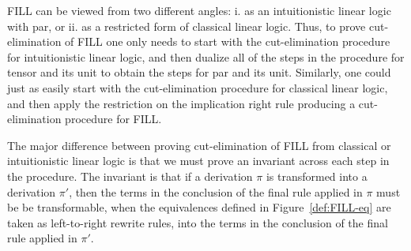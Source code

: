 \documentclass{elsarticle}
\begin{document}
FILL can be viewed from two different angles: i. as an intuitionistic
linear logic with par, or ii. as a restricted form of classical linear
logic.  Thus, to prove cut-elimination of FILL one only needs to start
with the cut-elimination procedure for intuitionistic linear logic,
and then dualize all of the steps in the procedure for tensor and its
unit to obtain the steps for par and its unit.  Similarly, one could
just as easily start with the cut-elimination procedure for classical
linear logic, and then apply the restriction on the implication right
rule producing a cut-elimination procedure for FILL.

The major difference between proving cut-elimination of FILL from
classical or intuitionistic linear logic is that we must prove an
invariant across each step in the procedure.  The invariant is that if
a derivation $\pi$ is transformed into a derivation $\pi'$, then the
terms in the conclusion of the final rule applied in $\pi$ must be be
transformable, when the equivalences defined in
Figure~\ref{def:FILL-eq} are taken as left-to-right rewrite rules,
into the terms in the conclusion of the final rule applied in $\pi'$.
\end{document}
